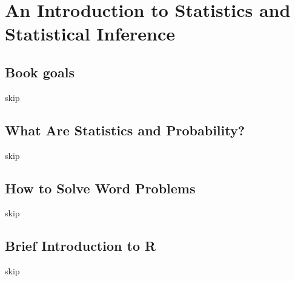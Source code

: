 \chapter{An Introduction to Statistics and Statistical Inference}  %

\section{Book goals}  %
skip

\section{What Are Statistics and Probability?}  %
skip

\section{How to Solve Word Problems}  %
skip

\section{Brief Introduction to R}  %
skip
